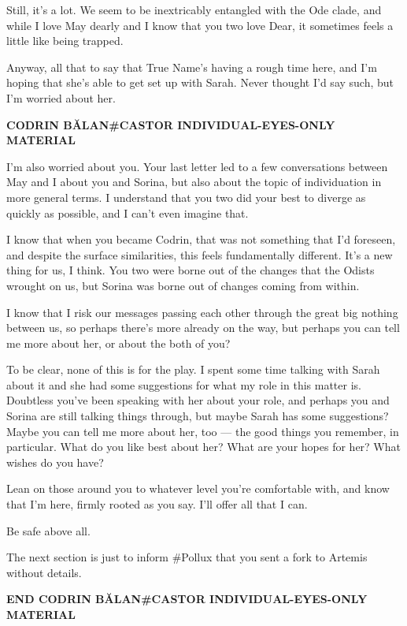 Still, it's a lot. We seem to be inextricably entangled with the Ode clade, and while I love May dearly and I know that you two love Dear, it sometimes feels a little like being trapped.

Anyway, all that to say that True Name's having a rough time here, and I'm hoping that she's able to get set up with Sarah. Never thought I'd say such, but I'm worried about her.

\begin{center}
\textbf{CODRIN BĂLAN\#CASTOR INDIVIDUAL-EYES-ONLY MATERIAL}
\end{center}

I'm also worried about you. Your last letter led to a few conversations between May and I about you and Sorina, but also about the topic of individuation in more general terms. I understand that you two did your best to diverge as quickly as possible, and I can't even imagine that.

I know that when you became Codrin, that was not something that I'd foreseen, and despite the surface similarities, this feels fundamentally different. It's a new thing for us, I think. You two were borne out of the changes that the Odists wrought on us, but Sorina was borne out of changes coming from within.

I know that I risk our messages passing each other through the great big nothing between us, so perhaps there's more already on the way, but perhaps you can tell me more about her, or about the both of you?

To be clear, none of this is for the play. I spent some time talking with Sarah about it and she had some suggestions for what my role in this matter is. Doubtless you've been speaking with her about your role, and perhaps you and Sorina are still talking things through, but maybe Sarah has some suggestions? Maybe you can tell me more about her, too — the good things you remember, in particular. What do you like best about her? What are your hopes for her? What wishes do you have?

Lean on those around you to whatever level you're comfortable with, and know that I'm here, firmly rooted as you say. I'll offer all that I can.

Be safe above all.

The next section is just to inform \#Pollux that you sent a fork to Artemis without details.

\begin{center}
\textbf{END CODRIN BĂLAN\#CASTOR INDIVIDUAL-EYES-ONLY MATERIAL}
\end{center}

